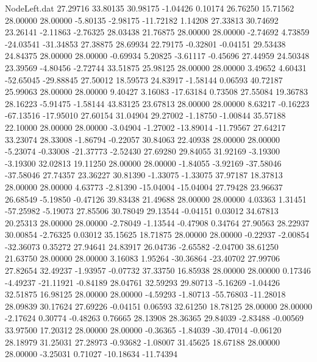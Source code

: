 \begin{filecontents}{NodeLeft.dat}
  27.29716   33.80135   30.98175    -1.04426    0.10174   26.76250   15.71562   28.00000   28.00000   -5.80135   -2.98175  -11.72182    1.14208
  27.33813   30.74692   23.26141    -2.11863   -2.76325   28.03438   21.76875   28.00000   28.00000   -2.74692    4.73859  -24.03541  -31.34853
  27.38875   28.69934   22.79175    -0.32801   -0.04151   29.53438   24.84375   28.00000   28.00000   -0.69934    5.20825   -3.61117   -0.45696
  27.44959   24.50348   23.39569    -4.80456   -2.72744   33.51875   25.98125   28.00000   28.00000    3.49652    4.60431  -52.65045  -29.88845
  27.50012   18.59573   24.83917    -1.58144    0.06593   40.72187   25.99063   28.00000   28.00000    9.40427    3.16083  -17.63184    0.73508
  27.55084   19.36783   28.16223    -5.91475   -1.58144   43.83125   23.67813   28.00000   28.00000    8.63217   -0.16223  -67.13516  -17.95010
  27.60154   31.04904   29.27002    -1.18750   -1.00844   35.57188   22.10000   28.00000   28.00000   -3.04904   -1.27002  -13.89014  -11.79567
  27.64217   33.23074   28.33008    -1.86794   -0.22057   30.84063   22.40938   28.00000   28.00000   -5.23074   -0.33008  -21.37773   -2.52430
  27.69280   29.84055   31.92169    -3.19300   -3.19300   32.02813   19.11250   28.00000   28.00000   -1.84055   -3.92169  -37.58046  -37.58046
  27.74357   23.36227   30.81390    -1.33075   -1.33075   37.97187   18.37813   28.00000   28.00000    4.63773   -2.81390  -15.04004  -15.04004
  27.79428   23.96637   26.68549    -5.19850   -0.47126   39.83438   21.49688   28.00000   28.00000    4.03363    1.31451  -57.25982   -5.19073
  27.85506   30.78049   29.13544    -0.04151    0.03012   34.67813   20.25313   28.00000   28.00000   -2.78049   -1.13544   -0.47908    0.34764
  27.90563   28.22937   30.00854    -2.76325    0.03012   35.15625   18.71875   28.00000   28.00000   -0.22937   -2.00854  -32.36073    0.35272
  27.94641   24.83917   26.04736    -2.65582   -2.04700   38.61250   21.63750   28.00000   28.00000    3.16083    1.95264  -30.36864  -23.40702
  27.99706   27.82654   32.49237    -1.93957   -0.07732   37.33750   16.85938   28.00000   28.00000    0.17346   -4.49237  -21.11921   -0.84189
  28.04761   32.59293   29.80713    -5.16269   -1.04426   32.51875   16.98125   28.00000   28.00000   -4.59293   -1.80713  -55.76803  -11.28018
  28.09839   30.17624   27.69226    -0.04151    0.06593   32.61250   18.78125   28.00000   28.00000   -2.17624    0.30774   -0.48263    0.76665
  28.13908   28.36365   29.84039    -2.83488   -0.00569   33.97500   17.20312   28.00000   28.00000   -0.36365   -1.84039  -30.47014   -0.06120
  28.18979   31.25031   27.28973    -0.93682   -1.08007   31.45625   18.67188   28.00000   28.00000   -3.25031    0.71027  -10.18634  -11.74394

\end{filecontents}
